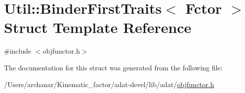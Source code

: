 \hypertarget{structUtil_1_1Private_1_1BinderFirstTraits}{}\section{Util\+:\+:Binder\+First\+Traits$<$ Fctor $>$ Struct Template Reference}
\label{structUtil_1_1Private_1_1BinderFirstTraits}


{\ttfamily \#include $<$objfunctor.\+h$>$}



The documentation for this struct was generated from the following file\+:\begin{DoxyCompactItemize}
\item 
/\+Users/archanar/\+Kinematic\+\_\+factor/adat-\/devel/lib/adat/\mbox{\hyperlink{adat-devel_2lib_2adat_2objfunctor_8h}{objfunctor.\+h}}\end{DoxyCompactItemize}
